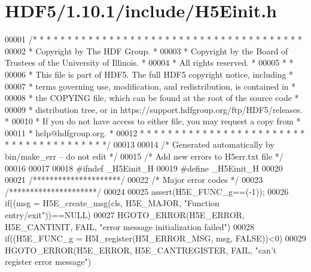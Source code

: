 \hypertarget{_h_d_f5_21_810_81_2include_2_h5_einit_8h_source}{}\section{H\+D\+F5/1.10.1/include/\+H5\+Einit.h}
\label{_h_d_f5_21_810_81_2include_2_h5_einit_8h_source}

\begin{DoxyCode}
00001 \textcolor{comment}{/* * * * * * * * * * * * * * * * * * * * * * * * * * * * * * * * * * * * * * *}
00002 \textcolor{comment}{ * Copyright by The HDF Group.                                               *}
00003 \textcolor{comment}{ * Copyright by the Board of Trustees of the University of Illinois.         *}
00004 \textcolor{comment}{ * All rights reserved.                                                      *}
00005 \textcolor{comment}{ *                                                                           *}
00006 \textcolor{comment}{ * This file is part of HDF5.  The full HDF5 copyright notice, including     *}
00007 \textcolor{comment}{ * terms governing use, modification, and redistribution, is contained in    *}
00008 \textcolor{comment}{ * the COPYING file, which can be found at the root of the source code       *}
00009 \textcolor{comment}{ * distribution tree, or in https://support.hdfgroup.org/ftp/HDF5/releases.  *}
00010 \textcolor{comment}{ * If you do not have access to either file, you may request a copy from     *}
00011 \textcolor{comment}{ * help@hdfgroup.org.                                                        *}
00012 \textcolor{comment}{ * * * * * * * * * * * * * * * * * * * * * * * * * * * * * * * * * * * * * * */}
00013 
00014 \textcolor{comment}{/* Generated automatically by bin/make\_err -- do not edit */}
00015 \textcolor{comment}{/* Add new errors to H5err.txt file */}
00016 
00017 
00018 \textcolor{preprocessor}{#ifndef \_H5Einit\_H}
00019 \textcolor{preprocessor}{#define \_H5Einit\_H}
00020 
00021 \textcolor{comment}{/*********************/}
00022 \textcolor{comment}{/* Major error codes */}
00023 \textcolor{comment}{/*********************/}
00024 
00025 assert(H5E\_FUNC\_g==(-1));
00026 \textcolor{keywordflow}{if}((msg = H5E\_create\_msg(cls, H5E\_MAJOR, \textcolor{stringliteral}{"Function entry/exit"}))==NULL)
00027     HGOTO\_ERROR(H5E\_ERROR, H5E\_CANTINIT, FAIL, \textcolor{stringliteral}{"error message initialization failed"})
00028 if((H5E\_FUNC\_g = H5I\_register(H5I\_ERROR\_MSG, msg, FALSE))<0)
00029     HGOTO\_ERROR(H5E\_ERROR, H5E\_CANTREGISTER, FAIL, "can't register error message")

\end{DoxyCode}
